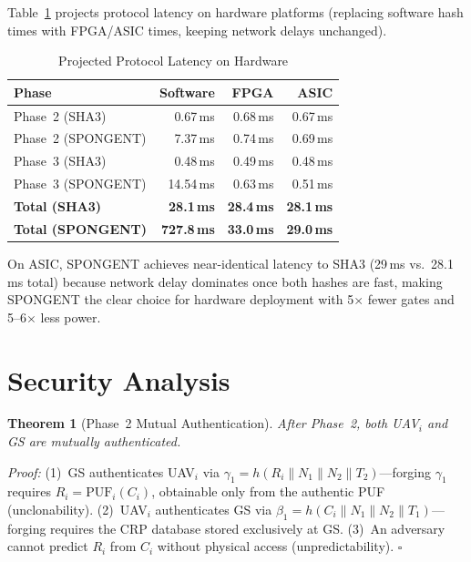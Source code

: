 \documentclass[conference]{IEEEtran}
\newtheorem{theorem}{Theorem}
\begin{document}
Table~\ref{tab:hw_latency} projects protocol latency on hardware platforms (replacing software hash times with FPGA/ASIC times, keeping network delays unchanged).

\begin{table}[H]
\centering
\caption{Projected Protocol Latency on Hardware}
\label{tab:hw_latency}
\footnotesize
\begin{tabular}{@{}lrrr@{}}
\toprule
\textbf{Phase} & \textbf{Software} & \textbf{FPGA} & \textbf{ASIC} \\
\midrule
Phase~2 (SHA3) & 0.67\,ms & 0.68\,ms & 0.67\,ms \\
Phase~2 (SPONGENT) & 7.37\,ms & 0.74\,ms & 0.69\,ms \\
Phase~3 (SHA3) & 0.48\,ms & 0.49\,ms & 0.48\,ms \\
Phase~3 (SPONGENT) & 14.54\,ms & 0.63\,ms & 0.51\,ms \\
\midrule
\textbf{Total (SHA3)} & \textbf{28.1\,ms} & \textbf{28.4\,ms} & \textbf{28.1\,ms} \\
\textbf{Total (SPONGENT)} & \textbf{727.8\,ms} & \textbf{33.0\,ms} & \textbf{29.0\,ms} \\
\bottomrule
\end{tabular}
\end{table}

On ASIC, SPONGENT achieves near-identical latency to SHA3 (29\,ms vs.\ 28.1\,ms total) because network delay dominates once both hashes are fast, making SPONGENT the clear choice for hardware deployment with 5$\times$ fewer gates and 5--6$\times$ less power.

\section{Security Analysis}
\label{sec:security_analysis}

\begin{theorem}[Phase~2 Mutual Authentication]
\label{thm:mutual}
After Phase~2, both UAV$_i$ and GS are mutually authenticated.
\end{theorem}
\emph{Proof:} (1)~GS authenticates UAV$_i$ via $\gamma_1 = h(R_i \| N_1 \| N_2 \| T_2)$---forging $\gamma_1$ requires $R_i = \text{PUF}_i(C_i)$, obtainable only from the authentic PUF (unclonability). (2)~UAV$_i$ authenticates GS via $\beta_1 = h(C_i \| N_1 \| N_2 \| T_1)$---forging requires the CRP database stored exclusively at GS. (3)~An adversary cannot predict $R_i$ from $C_i$ without physical access (unpredictability). \hfill$\square$
\end{document}
